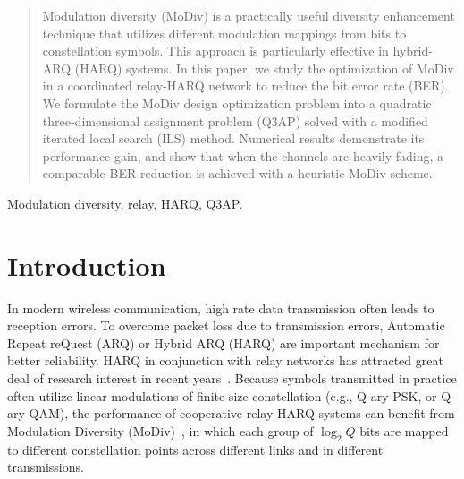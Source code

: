 \documentclass[journal]{IEEEtran}
\begin{document}
\begin{abstract}
Modulation diversity (MoDiv) is a practically useful diversity enhancement
technique that utilizes different modulation mappings from bits to constellation
symbols. This approach is particularly effective in hybrid-ARQ (HARQ) systems.
In this paper, we study the optimization of MoDiv in a coordinated relay-HARQ
network to reduce the bit error rate (BER).
We formulate the MoDiv design optimization problem into a quadratic
three-dimensional assignment problem (Q3AP) solved with a modified iterated
local search (ILS) method. Numerical results demonstrate its performance gain,
and show that when the channels are heavily fading, a comparable BER reduction
is achieved with a heuristic MoDiv scheme.
\end{abstract}

\begin{IEEEkeywords}
    Modulation diversity, relay, HARQ, Q3AP.
\end{IEEEkeywords}

%
\IEEEpeerreviewmaketitle


\section{Introduction}
In modern wireless communication, high rate data transmission often leads
to reception errors. To overcome packet loss due to transmission errors, 
Automatic Repeat reQuest (ARQ) or Hybrid ARQ (HARQ) are important mechanism for
better reliability. HARQ in conjunction with relay networks has attracted great
deal of research interest in recent years~\cite{ngo2014hybrid}. Because symbols
transmitted in practice often utilize linear modulations of finite-size
constellation (e.g., Q-ary PSK, or Q-ary QAM), the performance of cooperative
relay-HARQ systems can benefit from Modulation Diversity 
(MoDiv)~\cite{benelli1992new}, in which each
group of $\log_2 Q$ bits are mapped to different constellation points across
different links and in different transmissions. 
\end{document}

